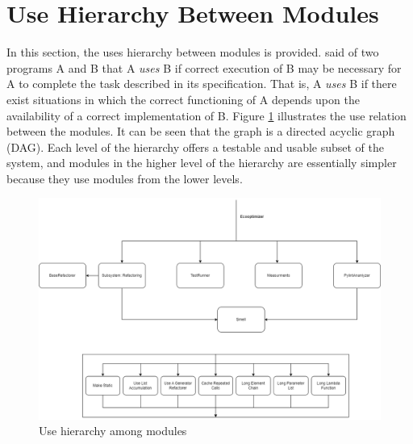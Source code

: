 \documentclass[12pt, titlepage]{article}
\begin{document}
\section{Use Hierarchy Between Modules} \label{SecUse}

In this section, the uses hierarchy between modules is
provided. \citet{Parnas1978} said of two programs A and B that A {\em uses} B if
correct execution of B may be necessary for A to complete the task described in
its specification. That is, A {\em uses} B if there exist situations in which
the correct functioning of A depends upon the availability of a correct
implementation of B.  Figure \ref{FigUH} illustrates the use relation between
the modules. It can be seen that the graph is a directed acyclic graph
(DAG). Each level of the hierarchy offers a testable and usable subset of the
system, and modules in the higher level of the hierarchy are essentially simpler
because they use modules from the lower levels.



\begin{figure}[H]
\centering
\includegraphics[width=\textwidth]{../../Images/use_hierarchy_modules.png}
\caption{Use hierarchy among modules}
\label{FigUH}
\end{figure}
\end{document}
